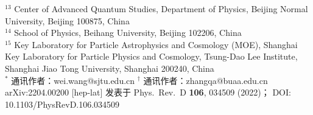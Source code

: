 \documentclass[11pt]{ctexart}
\begin{document}
{$^{13}$ Center of Advanced Quantum Studies, Department of Physics, Beijing Normal University,
Beijing 100875, China\\
$^{14}$ School of Physics, Beihang University, Beijing 102206, China\\
$^{15}$ Key Laboratory for Particle Astrophysics and Cosmology (MOE),
Shanghai Key Laboratory for Particle Physics and Cosmology,
Tsung-Dao Lee Institute, Shanghai Jiao Tong University, Shanghai 200240, China\\
$^\ast$ 通讯作者：wei.wang@sjtu.edu.cn \quad
$^\dagger$ 通讯作者：zhangqa@buaa.edu.cn\\[1mm]
arXiv:2204.00200 [hep-lat] \quad 发表于 Phys.\ Rev.\ D \textbf{106}, 034509 (2022)；
DOI: 10.1103/PhysRevD.106.034509
}

\vspace{2mm}
\begin{abstract}
\noindent
在大动量有效理论框架下并以一圈匹配精度，我们对支配横动量依赖（TMD）分布快度演化的 Collins-Soper 核进行了格点计算。我们首先在 MILC 的价 clover 夸克置于动力学 HISQ 海上、晶格间距 $a=0.12$~fm 的系综中，得到三个不同介子动量下的准 TMD 波函数，并用 Wilson 圈对相关的线性发散进行重正化。通过到光锥波函数的一圈匹配，我们在直至 0.6~fm 的横向分离范围内确定了 Collins-Soper 核。我们研究了来自算符混合与标度依赖的系统不确定度，以及更高幂次修正的影响。我们的结果原则上允许以一圈精度确定软函数及其他横动量依赖的物理量。
\end{abstract}






\end{document}
